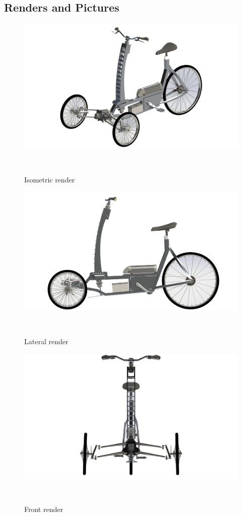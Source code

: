 \subsection{Renders and Pictures}
\begin{figure}[h!]
	\includegraphics[width=1.15\linewidth]{figs/05/Render_Design_B_3}
	\caption{Isometric render}
	\\[-1cm]
\end{figure}
\begin{figure}[h!]
	\includegraphics[width=1.1\linewidth]{figs/05/Render_Design_B_4}
	\caption{Lateral render}
	\\[-1cm]
\end{figure}
\begin{figure}[h!]
	\includegraphics[width=1.15\linewidth]{figs/05/Render_Design_B_6}
	\caption{Front render}
	\\[-1cm]
\end{figure}

